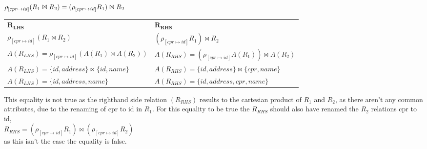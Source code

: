 $\rho_{[cpr\mapsto id]}(R_1 \Join R_2) = (\rho_{[cpr\mapsto id]} R_1) \Join R_2\\$

\begin{table}[ht]
\begin{tabular}{ll}
 $\bm{R_{LHS}}$ & $\bm{R_{RHS}}$  \\
 $\rho_{[cpr\mapsto id]}(R_1 \Join R_2)$ & $(\rho_{[cpr\mapsto id]} R_1) \Join R_2$  \\
 $A(R_{LHS}) = \rho_{[cpr\mapsto id]}(A(R_1) \Join A(R_2))$ & $A(R_{RHS}) = (\rho_{[cpr\mapsto id]}A(R_1)) \Join A(R_2)$  \\
 $A(R_{LHS}) = \{id, address\} \Join \{id, name\}$ & $A(R_{RHS}) = \{id, address\} \Join \{cpr, name\}$  \\
 $A(R_{LHS}) = \{id, address, name\}$ & $A(R_{RHS}) = \{id, address, cpr, name\}$
\end{tabular}
\end{table}
\FloatBarrier

This equality is not true as the righthand side relation $(R_{RHS})$ results to the cartesian product of $R_1$ and $R_2$, as there aren't any common attributes, due to the renaming of cpr to id in $R_1$.
For this equality to be true the $R_{RHS}$ should also have renamed the $R_2$ relations cpr to id,\\
$R_{RHS} = (\rho_{[cpr\mapsto id]} R_1) \Join (\rho_{[cpr\mapsto id]} R_2)$\\
as this isn't the case the equality is false.